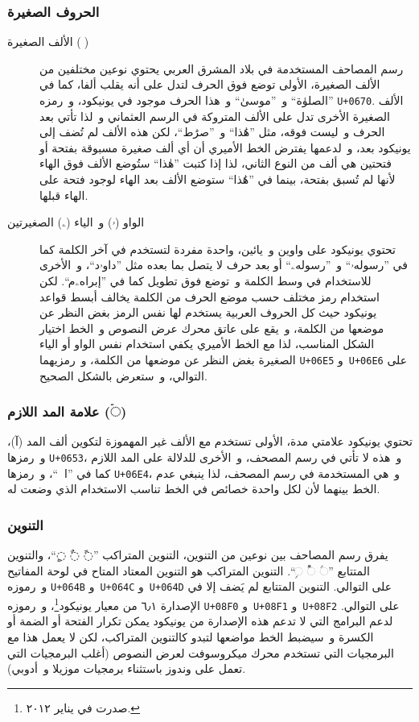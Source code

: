 \documentclass{article}
\begin{document}
\subsubsection{الحروف الصغيرة}
\begin{description}
\item[الألف الصغيرة (◌ٰ)]
	رسم المصاحف المستخدمة في بلاد المشرق العربي يحتوي نوعين مختلفين من
	الألف الصغيرة، الأولى توضع فوق الحرف لتدل على أنه يقلب ألفا، كما في
	”الصلوٰة“ و ”موسىٰ“ و هذا الحرف موجود في يونيكود، و رمزه
	\texttt{U+0670}. الألف الصغيرة الأخرى تدل على الألف المتروكة في
	الرسم العثماني و لذا تأتي بعد الحرف و ليست فوقه، مثل ”هَٰذا“ و ”صرَٰط“،
	لكن هذه الألف لم تُضف إلى يونيكود بعد، و لدعمها يفترض الخط الأميري أن
	أي ألف صغيرة مسبوقة بفتحة أو فتحتين هي ألف من النوع الثاني، لذا إذا
	كتبت ”هٰذا“ ستُوضع الألف فوق الهاء لأنها لم تُسبق بفتحة، بينما في ”هَٰذا“
	ستوضع الألف بعد الهاء لوجود فتحة على الهاء قبلها.

\item[الواو (ۥ) و الياء (ۦ) الصغيرتين]
	تحتوي يونيكود على واوين و يائين، واحدة مفردة لتستخدم في آخر الكلمة
	كما في ”رسولهۥ“ و ”رسولهۦ“ أو بعد حرف لا يتصل بما بعده مثل ”داوۥد“،
	و الأخرى للاستخدام في وسط الكلمة و توضع فوق تطويل كما في ”إبراهۦم“.
	لكن استخدام رمز مختلف حسب موضع الحرف من الكلمة يخالف أبسط قواعد
	يونيكود حيث كل الحروف العربية يستخدم لها نفس الرمز بغض النظر عن
	موضعها من الكلمة، و يقع على عاتق محرك عرض النصوص و الخط اختيار الشكل
	المناسب، لذا مع الخط الأميري يكفي استخدام نفس الواو أو الياء الصغيرة
	بغض النظر عن موضعها من الكلمة، و رمزيهما \texttt{U+06E5}
	و \texttt{U+06E6} على التوالي، و ستعرض بالشكل الصحيح.
\end{description}

\subsubsection{علامة المد اللازم (◌ۤ)}
تحتوي يونيكود علامتي مدة، الأولى تستخدم مع الألف غير المهموزة لتكوين ألف
المد (آ)، و رمزها \texttt{U+0653}، و هذه لا تأتي في رسم المصحف، و الأخرى
للدلالة على المد اللازم كما في ”الۤمۤ“، و رمزها \texttt{U+06E4}، و هي
المستخدمة في رسم المصحف، لذا ينبغي عدم الخط بينهما لأن لكل واحدة خصائص
في الخط تناسب الاستخدام الذي وضعت له.

\subsubsection{التنوين}
يفرق رسم المصاحف بين نوعين من التنوين، التنوين المتراكب ”◌ً ◌ٌ ◌ٍ“،
والتنوين المتتابع ”◌ࣰ ◌ࣱ ◌ࣲ“. التنوين المتراكب هو التنوين المعتاد المتاح
في لوحة المفاتيح و رموزه \texttt{U+064B} و \texttt{U+064C}
و \texttt{U+064D} على التوالي. التنوين المتتابع لم يَضف إلا في الإصدارة
٦٫١ من معيار يونيكود\footnote{صدرت في يناير ٢٠١٢.}، و رموزه
\texttt{U+08F0} و \texttt{U+08F1} و \texttt{U+08F2} على التوالي. لدعم
البرامج التي لا تدعم هذه الإصدارة من يونيكود يمكن تكرار الفتحة أو الضمة
أو الكسرة و سيضبط الخط مواضعها لتبدو كالتنوين المتراكب، لكن لا يعمل هذا
مع البرمجيات التي تستخدم محرك ميكروسوفت لعرض النصوص (أغلب البرمجيات التي
تعمل على وندوز باستثناء برمجيات موزيلا و أدوبي).
\end{document}
